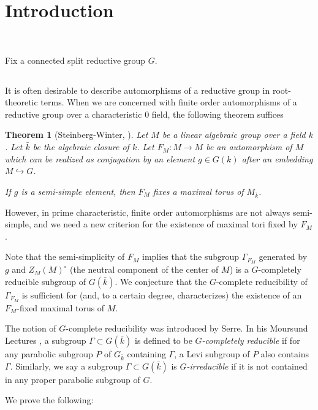 \documentclass[10pt,a4paper,twoside]{article}
\newtheorem*{thm*}{Theorem}
\begin{document}
\section{Introduction}~

Fix a connected split reductive group $G$.

\subsection{}

It is often desirable to describe
automorphisms of a reductive group
in root-theoretic terms.
When we are concerned with finite order automorphisms
of a reductive group over a characteristic $0$ field,
the following theorem suffices
\begin{thm*} [Steinberg-Winter, {\cite[Theorem 7.5]{St68}}]
Let $M$ be a linear algebraic group over a field $k$.
Let $\bar k$ be the algebraic closure of $k$.
Let $F_M : M\to M$ be an automorphism of $M$ which can be realized
as conjugation by an element $g\in G(k)$ after an embedding
$M \hookrightarrow G$.

If $g$ is a semi-simple element, then $F_M$ fixes a maximal torus of $M_{\bar k}$.
\end{thm*}
However, in prime characteristic, finite order automorphisms are not always semi-simple, and we need a new criterion for the existence of maximal tori fixed by $F_M$.

Note that the semi-simplicity of $F_M$ implies that the subgroup $\Gamma_{F_M}$
generated by $g$ and $Z_M(M)^\circ$ (the neutral component of the center of $M$)
is a $G$-completely reducible subgroup of $G(\bar k)$.
We conjecture that the $G$-complete reducibility 
of $\Gamma_{F_M}$ is sufficient for (and, to a certain degree, characterizes)
the existence of an $F_M$-fixed maximal torus of $M$.

The notion of $G$-complete reducibility was
introduced by Serre.
In his Moursund Lectures \cite{Se98},
a subgroup $\Gamma \subset G(\bar k)$ is defined to be \textit{$G$-completely reducible}
if for any parabolic subgroup $P$ of $G_{\bar k}$ containing $\Gamma$,
    a Levi subgroup of $P$ also contains $\Gamma$. 
Similarly, we say
a subgroup $\Gamma \subset G(\bar k)$ is \textit{$G$-irreducible}
if it is not contained in any proper parabolic subgroup of $G$.


We prove the following:
\end{document}
